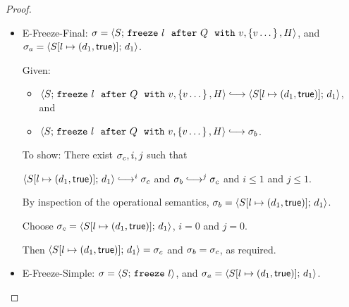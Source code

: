 \begin{proof}
\begin{itemize}
\begin{itemize}
\begin{enumerate}
          The proof is as follows:

          From the premises of {\sc E-Spawn-Handler}, \\
          $S(l) = \state{d_1}{\status_1}$ and
          $d_2 \userleq d_1$ and 
          $d_2 \notin H$ and
          $d_2 \in Q$.

          Hence, by {\sc E-Spawn-Handler}, \\
          $\config{S'}{\freezeafterfull{l}{Q}{\lam{x}{e_0}}{\setof{e',
              \dots}}{H}} \parstepsto \\
          \config{S'}{\freezeafterfull{l}{Q}{\lam{x}{e_0}}{\setof{\subst{e_0}{x}{d_2}, e',
                \dots}}{\{d_2\}\cup H}}$.

          Hence $\conf_b \parstepsto \conf_c$.
        \end{enumerate}

      \end{itemize}

    \item {\sc E-Freeze-Final}: $\sigma =
      \langle S;\, \mbox{\texttt{freeze}}~l~~{\mbox{\texttt{after}}}~Q~~{\mbox{\texttt{with}}}~v, \left\{v\dots\right\}, H \rangle$, and
      $\sigma_a = \langle S[l \mapsto (d_1, \textsf{true})];\, d_1 \rangle$.

      Given:
      \begin{itemize}
      \item $\config{S}{\freezeafterfull{l}{Q}{v}{\setof{v\dots}}{H}}
        \parstepsto \config{\extS{S}{l}{d_1}{\frozentrue}}{d_1}$, and
      \item $\config{S}{\freezeafterfull{l}{Q}{v}{\setof{v\dots}}{H}} \parstepsto \conf_b$.
      \end{itemize}

      To show: There exist $\sigma_c, i, j$ such that

      $\config{\extS{S}{l}{d_1}{\frozentrue}}{d_1} \parstepsto^i
      \conf_c$ and $\conf_b \parstepsto^j \conf_c$ and $i \leq 1$ and
      $j \leq 1$.

      By inspection of the operational semantics, $\sigma_b =
      \langle S[l \mapsto (d_1, \textsf{true})];\, d_1 \rangle$.

      Choose $\sigma_c = \langle S[l \mapsto (d_1, \textsf{true})];\, d_1 \rangle$,
      $i = 0$ and $j = 0$.

      Then $\langle S[l \mapsto (d_1, \textsf{true})];\, d_1 \rangle = \sigma_c$ and
      $\sigma_b = \sigma_c$, as required.

    \item {\sc E-Freeze-Simple}: $\sigma =
      \langle S;\, \mbox{\texttt{freeze}}~l \rangle$, and $\sigma_a =
      \langle S[l \mapsto (d_1, \textsf{true})];\, d_1 \rangle$.


\end{itemize}
\end{proof}
